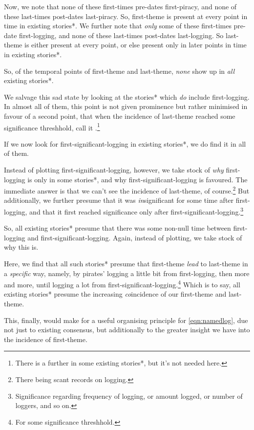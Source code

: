 			Now, we note that none of these first-times pre-dates first-piracy, and none of these last-times post-dates last-piracy. So, first-theme is present at every point in time in existing stories*. We further note that \emph{only} some of these first-times pre-date first-logging, and none of these last-times post-dates last-logging. So last-theme is either present at every point, or else present only in later points in time in existing stories*.
			
			So, of the temporal points of first-theme and last-theme, \emph{none} show up in \emph{all} existing stories*.
			
			We salvage this sad state by looking at the stories* which \emph{do} include first-logging. In almost all of them, this point is not given prominence but rather minimised in favour of a second point, that when the incidence of last-theme reached some significance threshhold, call it .\footnote{There is a further  in some existing stories*, but it's not needed here.}
			
			If we now look for first-significant-logging in existing stories*, we do find it in all of them.
			
			Instead of plotting first-significant-logging, however, we take stock of \emph{why} first-logging is only in some stories*, and why first-significant-logging is favoured. The immediate answer is that we can't see the incidence of last-theme, of course.\footnote{There being scant records on logging.} But additionally, we further presume that it was \emph{in}significant for some time after first-logging, and that it first reached significance only after first-significant-logging.\footnote{Significance regarding frequency of logging, or amount logged, or number of loggers, and so on.}
			
			So, all existing stories* presume that there was some non-null time between first-logging and first-significant-logging. Again, instead of plotting, we take stock of why this is.
			
			Here, we find that all such stories* presume that first-theme \emph{lead} to last-theme in a \emph{specific} way, namely, by pirates' logging a little bit from first-logging, then more and more, until logging a lot from first-significant-logging.\footnote{For some significance threshhold.} Which is to say, all existing stories* presume the increasing \emph{co}incidence of our first-theme and last-theme.
			
			This, finally, would make for a useful organising principle for \ref{eqn:namedlog}, due not just to existing consensus, but additionally to the greater insight we have into the incidence of first-theme.
			
